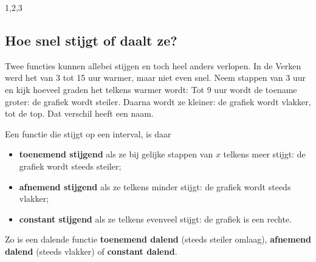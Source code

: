 \begin{alleenvoor}{1,2,3}
\subsection{Hoe snel stijgt of daalt ze?}

Twee functies kunnen allebei stijgen en toch heel anders verlopen. In de Verken werd het van 3 tot 15 uur warmer, maar niet even snel. Neem stappen van 3 uur en kijk hoeveel graden het telkens warmer wordt:
Tot 9 uur wordt de toename groter: de grafiek wordt steiler. Daarna wordt ze kleiner: de grafiek wordt vlakker, tot de top. Dat verschil heeft een naam.

\begin{theorie}
Een functie die stijgt op een interval, is daar
\begin{itemize}
\item \textbf{\textcolor{accent}{toenemend stijgend}} als ze bij gelijke stappen van $x$ telkens meer stijgt: de grafiek wordt steeds steiler;
\item \textbf{\textcolor{accent}{afnemend stijgend}} als ze telkens minder stijgt: de grafiek wordt steeds vlakker;
\item \textbf{\textcolor{accent}{constant stijgend}} als ze telkens evenveel stijgt: de grafiek is een rechte.
\end{itemize}
Zo is een dalende functie \textbf{\textcolor{accent}{toenemend dalend}} (steeds steiler omlaag), \textbf{\textcolor{accent}{afnemend dalend}} (steeds vlakker) of \textbf{\textcolor{accent}{constant dalend}}.
\end{theorie}


\end{alleenvoor}
